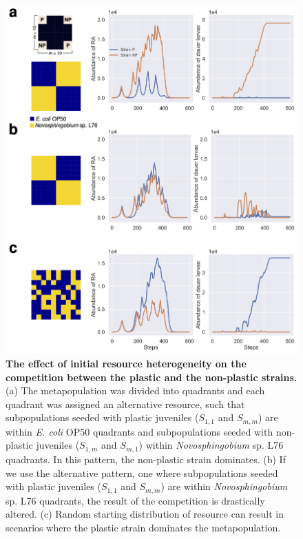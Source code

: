 \documentclass[10pt,letterpaper]{article}
\newcommand{\ecoli}{\emph{E. coli} OP50}
\newcommand{\novo}{\emph{Novosphingobium} sp. L76}
\begin{document}
\begin{figure}
\begin{adjustwidth}{-2in}{0in}
\begin{flushright}
\label{fig:fig2}
\end{flushright}
\end{adjustwidth}
\end{figure}

\begin{figure}
\begin{adjustwidth}{-2in}{0in}
    \begin{flushright}
\includegraphics[width=140mm]{figures/figure3.jpg}
\caption{\textbf{The effect of initial resource heterogeneity on the competition between the plastic and the non-plastic strains.} (a) The metapopulation was divided into quadrants and each quadrant was assigned an alternative resource, such that subpopulations seeded with plastic juveniles ($S_{1,1}$ and $S_{m,m}$) are within \ecoli{} quadrants and subpopulations seeded with non-plastic juveniles ($S_{1,m}$ and $S_{m,1}$) within \novo{} quadrants. In this pattern, the non-plastic strain dominates. (b) If we use the alternative pattern, one where subpopulations seeded with plastic juveniles ($S_{1,1}$ and $S_{m,m}$) are within \novo{} quadrants, the result of the competition is drastically altered. (c) Random starting distribution of resource can result in scenarios where the plastic strain dominates the metapopulation.}
\label{fig:fig3}
\end{flushright}
\end{adjustwidth}
\end{figure}
\end{document}
